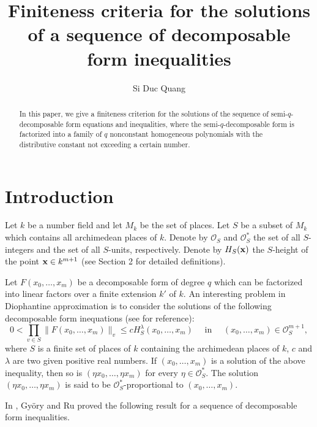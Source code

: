 \documentclass[12pt,leqno]{amsart}
\title[The solutions of a sequence of decomposable form inequalities]{Finiteness criteria for the solutions of a sequence of decomposable form inequalities}
\author{Si Duc Quang}
\numberwithin{equation}{section}
\begin{document}
\maketitle 

\begin{abstract}
In this paper, we give a finiteness criterion for the solutions of the sequence of semi-$q$-decomposable form equations and inequalities, where the semi-$q$-decomposable form is factorized into a family of $q$ nonconstant homogeneous polynomials with the distributive constant not exceeding a certain number.
\end{abstract}

\def\thefootnote{\empty}

\section{Introduction}
Let $k$ be a number field and let $M_k$ be the set of places. Let $S$ be a subset of $M_k$ which contains all archimedean places of $k$. Denote by $\mathcal O_S$ and $\mathcal O_{S}^*$ the set of all $S$-integers and the set of all $S$-units, respectively. Denote by $H_S({\bf x})$ the $S$-height of the point ${\bf x}\in k^{m+1}$ (see Section 2 for detailed definitions).

Let $F(x_0,\ldots,x_m)$ be a decomposable form of degree $q$ which can be factorized into linear factors over a finite extension $k'$ of $k$. An interesting problem in Diophantine approximation is to consider the solutions of the following decomposable form inequations (see \cite{EV1,Sch77,Sch73,Sch80} for reference):
$$0<\prod_{v \in S}\|F(x_0, \ldots, x_m)\|_{v} \leqslant c H_{S}^{\lambda}(x_0, \ldots, x_m) \quad \text { in } \quad (x_0, \ldots, x_m) \in \mathcal{O}_{S}^{m+1},$$
where $S$ is a finite set of places of $k$ containing the archimedean places of $k$, $c$ and $\lambda$ are two given positive real numbers.
If $(x_0, \ldots, x_m)$ is a solution of the above inequality, then so is $(\eta x_0, \ldots, \eta x_m)$ for every $\eta \in \mathcal{O}_{S}^{*}$. The solution $(\eta x_0, \ldots, \eta x_m)$ is said to be $\mathcal{O}_{S}^{*}$-proportional to $(x_0, \ldots, x_m)$.

In \cite{GR}, Gy\"{o}ry and Ru proved the following result for a sequence of decomposable form inequalities.
\end{document}
